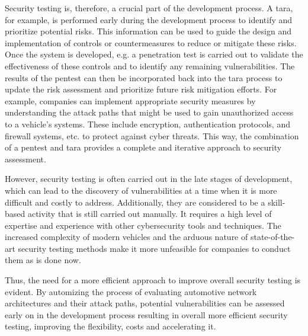 Security testing is, therefore, a crucial part of the development process.
A \gls{tara}, for example, is performed early during the development process to identify and prioritize potential risks.
This information can be used to guide the design and implementation of controls or countermeasures to reduce or mitigate these risks.
Once the system is developed, e.g. a penetration test is carried out to validate the effectiveness of these controls and to identify any remaining vulnerabilities. 
The results of the pentest can then be incorporated back into the \gls{tara} process to update the risk assessment and prioritize future risk mitigation efforts. 
For example, companies can implement appropriate security measures by understanding the attack paths that might be used to gain unauthorized access to a vehicle's systems. 
These include encryption, authentication protocols, and firewall systems, etc. to protect against cyber threats.
This way, the combination of a pentest and \gls{tara} provides a complete and iterative approach to security assessment.\par
However, security testing is often carried out in the late stages of development, which can lead to the discovery of vulnerabilities at a time when it is more difficult and costly to address.
Additionally, they are considered to be a skill-based activity that is still carried out manually.
It requires a high level of expertise and experience with other cybersecurity tools and techniques. 
The increased complexity of modern vehicles and the arduous nature of state-of-the-art security testing methods make it more unfeasible for companies to conduct them as is done now.\par
Thus, the need for a more efficient approach to improve overall security testing is evident. 
By automizing the process of evaluating automotive network architectures and their attack paths, 
potential vulnerabilities can be assessed early on in the development process resulting in overall more efficient security testing, improving the flexibility, costs and accelerating it.
\\

